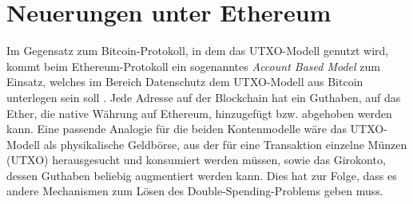 \section{Neuerungen unter Ethereum}
Im Gegensatz zum Bitcoin-Protokoll, in dem das UTXO-Modell genutzt wird, kommt beim Ethereum-Protokoll ein sogenanntes \emph{Account Based Model} zum Einsatz, welches im Bereich Datenschutz dem UTXO-Modell aus Bitcoin unterlegen sein soll \cite[]{beres_2020}. Jede Adresse auf der Blockchain hat ein Guthaben, auf das Ether, die native Währung auf Ethereum, hinzugefügt bzw. abgehoben werden kann. Eine passende Analogie für die beiden Kontenmodelle wäre das UTXO-Modell als physikalische Geldbörse, aus der für eine Transaktion einzelne Münzen (UTXO) herausgesucht und konsumiert werden müssen, sowie das Girokonto, dessen Guthaben beliebig augmentiert werden kann. Dies hat zur Folge, dass es andere Mechanismen zum Lösen des Double-Spending-Problems geben muss.


